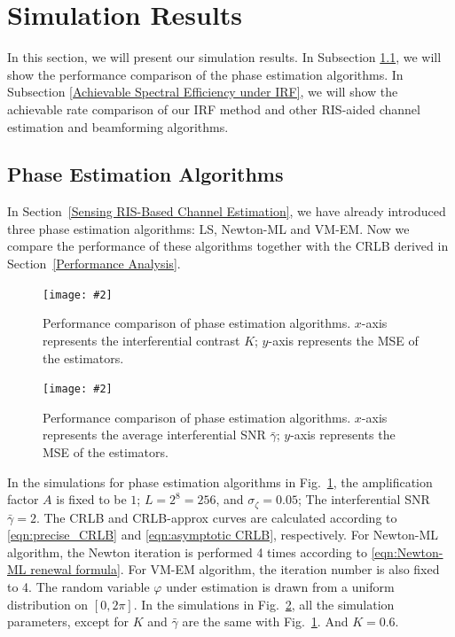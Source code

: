 \documentclass[12pt,draftclsnofoot,journal,onecolumn]{IEEEtran}
\theoremstyle{nonumberplain}
\newcommand{\myincludegraphics}[2][width=12cm]{\texttt{[image: \#2]}}
\begin{document}
\section{Simulation Results}
\label{Simulation Results}
In this section, we will present our simulation results. In Subsection \ref{Phase Estimation Algorithms}, we will show the performance comparison of the phase estimation algorithms. In Subsection \ref{Achievable Spectral Efficiency under IRF}, we will show the achievable rate comparison of our \ac{IRF} method and other RIS-aided channel estimation and beamforming algorithms. 

\subsection{Phase Estimation Algorithms} \label{Phase Estimation Algorithms}
    In Section~\ref{Sensing RIS-Based Channel Estimation}, we have already introduced three phase estimation algorithms: LS, Newton-ML and VM-EM. Now we compare the performance of these algorithms together with the CRLB derived in Section~\ref{Performance Analysis}.  
    \begin{figure}[!t]
        \centering
        \myincludegraphics{data/pe_K.pdf}
        \caption{Performance comparison of phase estimation algorithms. $x$-axis represents the interferential contrast $K$; $y$-axis represents the MSE of the estimators.}
        \label{fig:phase estimation_K}
    \end{figure}
    \begin{figure}[!t]
        \centering
        \myincludegraphics{data/pe_gamma.pdf}
        \caption{Performance comparison of phase estimation algorithms. $x$-axis represents the average interferential SNR $\bar{\gamma}$; $y$-axis represents the MSE of the estimators.}
        \label{fig:phase estimation_gamma}
    \end{figure}
    In the simulations for phase estimation algorithms in Fig.~\ref{fig:phase estimation_K}, the amplification factor $A$ is fixed to be $1$; $L=2^8=256$, and $\sigma_\zeta=0.05$; The interferential SNR $\bar{\gamma}=2$. The CRLB and CRLB-approx curves are calculated according to \eqref{eqn:precise_CRLB} and \eqref{eqn:asymptotic CRLB}, respectively. For Newton-ML algorithm, the Newton iteration is performed 4 times according to \eqref{eqn:Newton-ML renewal formula}. For VM-EM algorithm, the iteration number is also fixed to 4. The random variable $\varphi$ under estimation is drawn from a uniform distribution on $[0,2\pi]$. In the simulations in Fig.~\ref{fig:phase estimation_gamma}, all the simulation parameters, except for $K$ and $\bar{\gamma}$ are the same with Fig.~\ref{fig:phase estimation_K}. And $K=0.6$.  
\end{document}
